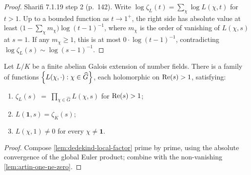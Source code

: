 \begin{proof}
  Sharifi 7.1.19 step 2 (p.~142). Write
  $\log\zeta_L(t) = \sum_\chi \log L(\chi, t)$ for $t > 1$. Up to a
  bounded function as $t \to 1^+$, the right side has absolute value
  at least $\bigl(1 - \sum_\chi m_\chi\bigr)\log(t-1)^{-1}$, where
  $m_\chi$ is the order of vanishing of $L(\chi, s)$ at $s = 1$. If
  any $m_\chi \ge 1$, this is at most $0\cdot\log(t-1)^{-1}$,
  contradicting $\log\zeta_L(s) \sim \log(s-1)^{-1}$.
\end{proof}

\begin{theorem}\label{thm:dedekind-zeta-factorisation}
  Let $L/K$ be a finite abelian Galois extension of number fields.
  There is a family of functions
  $\left\{ L(\chi, \cdot) : \chi\in\widehat{G} \right\}$, each holomorphic on
  $\operatorname{Re}(s) > 1$, satisfying:
  \begin{enumerate}
  \item $\displaystyle\zeta_L(s)
    \;=\; \prod_{\chi\in\widehat{G}} L(\chi, s)$ for $\operatorname{Re}(s) > 1$;
  \item $L(\mathbf{1}, s) = \zeta_K(s)$;
  \item $L(\chi, 1) \ne 0$ for every $\chi \ne \mathbf{1}$.
  \end{enumerate}
\end{theorem}

\begin{proof}
  Compose \cref{lem:dedekind-local-factor} prime by prime, using the
  absolute convergence of the global Euler product; combine with the
  non-vanishing \cref{lem:artin-one-ne-zero}.
\end{proof}
